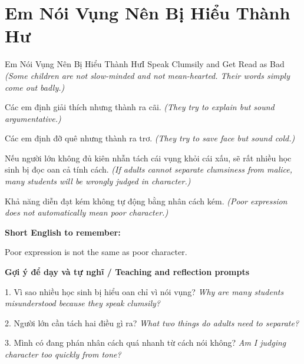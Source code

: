 \section{Em Nói Vụng Nên Bị Hiểu Thành Hư}
\begin{truyen}{Em Nói Vụng Nên Bị Hiểu Thành Hư}{I Speak Clumsily and Get Read as Bad}
\textit{(Some children are not slow-minded and not mean-hearted. Their words simply come out badly.)}

Các em định giải thích nhưng thành ra cãi.
\textit{(They try to explain but sound argumentative.)}

Các em định đỡ quê nhưng thành ra trơ.
\textit{(They try to save face but sound cold.)}

Nếu người lớn không đủ kiên nhẫn tách cái vụng khỏi cái xấu, sẽ rất nhiều học sinh bị đọc oan cả tính cách.
\textit{(If adults cannot separate clumsiness from malice, many students will be wrongly judged in character.)}

\end{truyen}

\begin{baihoc}
Khả năng diễn đạt kém không tự động bằng nhân cách kém.
\textit{(Poor expression does not automatically mean poor character.)}
\end{baihoc}

\begin{ghinhoanh}
\textbf{Short English to remember:}

Poor expression is not the same as poor character.

\end{ghinhoanh}

\begin{tuhocnhanh}
\textbf{Gợi ý để dạy và tự nghĩ / Teaching and reflection prompts}

1. Vì sao nhiều học sinh bị hiểu oan chỉ vì nói vụng? \textit{Why are many students misunderstood because they speak clumsily?}

2. Người lớn cần tách hai điều gì ra? \textit{What two things do adults need to separate?}

3. Mình có đang phán nhân cách quá nhanh từ cách nói không? \textit{Am I judging character too quickly from tone?}
\end{tuhocnhanh}
\ngancach


